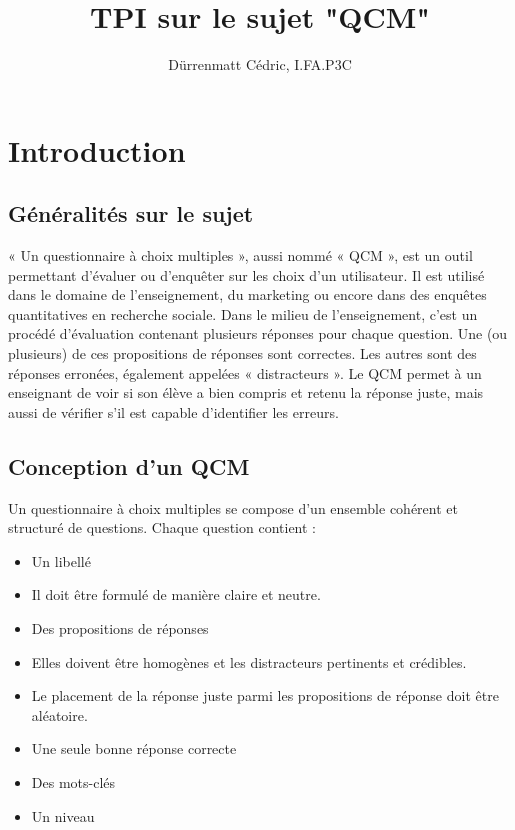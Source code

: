 \documentclass[a4paper]{article}
\author{Dürrenmatt Cédric, I.FA.P3C}
\title{TPI sur le sujet "QCM"}
\begin{document}
	\clearpage\maketitle
	\thispagestyle{empty}
	\newpage
	
	\tableofcontents
	\newpage
	
	\section{Introduction}
	\subsection{Généralités sur le sujet}
	« Un questionnaire à choix multiples », aussi nommé « QCM », est un outil permettant d’évaluer ou d’enquêter sur les choix d’un utilisateur.
	Il est utilisé dans le domaine de l’enseignement, du marketing ou encore dans des enquêtes quantitatives en recherche sociale.
	Dans le milieu de l’enseignement, c’est un procédé d’évaluation contenant plusieurs réponses pour chaque question. Une (ou plusieurs) de ces propositions de réponses sont correctes. Les autres sont des réponses erronées, également appelées « distracteurs ».
	Le QCM permet à un enseignant de voir si son élève a bien compris et retenu la réponse juste, mais aussi de vérifier s’il est capable d’identifier les erreurs.
	
	\bigskip
	\subsection{Conception d’un QCM}
	
	Un questionnaire à choix multiples se compose d’un ensemble cohérent et structuré de questions.
	Chaque question contient :
	\begin{itemize}
		\item Un libellé
		\item Il doit être formulé de manière claire et neutre.
		\item Des propositions de réponses
		\item Elles doivent être homogènes et les distracteurs pertinents et crédibles.
		\item Le placement de la réponse juste parmi les propositions de réponse doit être aléatoire.
		\item Une seule bonne réponse correcte
		\item Des mots-clés
		\item Un niveau
	\end{itemize}
\end{document}
